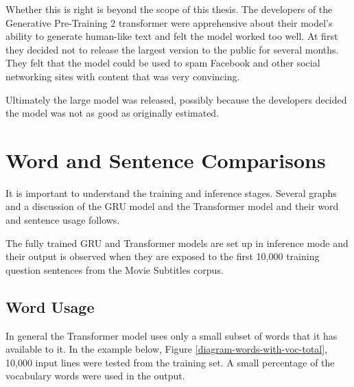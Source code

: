 Whether this is right is beyond the scope of this thesis. The developers of the Generative Pre-Training 2 transformer were apprehensive about their model's ability to generate human-like text and felt the model worked too well. 
At first they decided not to release the largest version to the public for several months. 
They felt that the model could be used to spam Facebook and other social networking sites with content that was very convincing. 

Ultimately the large model was released, possibly because the developers decided the model was not as good as originally estimated. %

\section{Word and Sentence Comparisons}

It is important to understand the training and inference stages. Several graphs and a discussion of the GRU model and the Transformer model and their word and sentence usage follows.

The fully trained GRU and Transformer models are set up in inference mode and their output is observed when they are exposed to the first 10,000 training question sentences from the Movie Subtitles corpus.

\subsection{Word Usage}

In general the Transformer model uses only a small subset of words that it has available to it. In the example below, Figure \ref{diagram-words-with-voc-total}, 10,000 input lines were tested from the training set. A small percentage of the vocabulary words were used in the output. %

